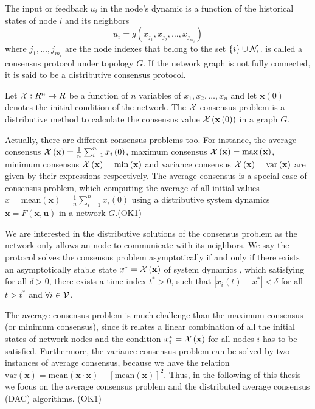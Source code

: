 The input or feedback $u_{i}$ in the node's dynamic is a function
of the historical states of node $i$ and its neighbors
\begin{equation}
u_{i}=g\left(x_{j_{1}},x_{j_{2}},\ldots,x_{j_{m_{i}}}\right)\label{eq:consensus protocol}
\end{equation}
where $j_{1},\ldots,j_{m_{i}}$ are the node indexes that belong to
the set $\left\{ i\right\} \cup{\cal N}_{i}$. 
is called a consensus protocol under topology $G$. If the network
graph is not fully connected, it is said to be a distributive consensus
protocol. 
\begin{defn}
Let ${\cal X}:R^{n}\to R$ be a function of $n$ variables of $x_{1},x_{2},\ldots,x_{n}$
and let $\mathbf{x}\left(0\right)$ denotes the initial condition
of the network. The ${\cal X}$-consensus problem is a distributive
method to calculate the consensus value ${\cal X}\left(\mathbf{x}\left(0\right)\right)$
in a graph $G$. 
\end{defn}
Actually, there are different consensus problems too. For instance,
the average consensus ${\cal X}\left(\mathbf{x}\right)=\frac{1}{n}\sum_{i=1}^{n}x_{i}\left(0\right)$,
maximum consensus ${\cal X}\left(\mathbf{x}\right)=\max\left(\mathbf{x}\right)$,
minimum consensus ${\cal X}\left(\mathbf{x}\right)=\min\left(\mathbf{x}\right)$
and variance consensus ${\cal X}\left(\mathbf{x}\right)=\mbox{var}\left(\mathbf{x}\right)$
are given by their expressions respectively. The average consensus
is a special case of consensus problem, which computing the average
of all initial values $\overline{x}=\mbox{mean}\left(\mathbf{x}\right)=\frac{1}{n}\sum_{i=1}^{n}x_{i}\left(0\right)$
using a distributive system dynamics $\mathbf{\dot{x}}=F\left(\mathbf{x},\mathbf{u}\right)$
in a network $G$.(OK1)

We are interested in the distributive solutions of the consensus problem
as the network only allows an node to communicate with its neighbors.
We say the protocol  solves the
consensus problem asymptotically if and only if there exists an asymptotically
stable state $x^{*}={\cal X}\left(\mathbf{x}\right)$ of system dynamics
, which satisfying for all $\delta>0$,
there exists a time index $t^{*}>0$, such that $\left|x_{i}(t)-x^{*}\right|<\delta$
for all $t>t^{*}$ and $\forall i\in{\cal V}$.

The average consensus problem is much challenge than the maximum consensus
(or minimum consensus), since it relates a linear combination of all
the initial states of network nodes and the condition $x_{i}^{*}={\cal X}\left(\mathbf{x}\right)$
for all nodes $i$ has to be satisfied. Furthermore, the variance
consensus problem can be solved by two instances of average consensus,
because we have the relation $\mbox{var}\left(\mathbf{x}\right)=\mbox{mean}\left(\mathbf{x}\cdot\mathbf{x}\right)-\left[\mbox{mean}\left(\mathbf{x}\right)\right]^{2}$.
Thus, in the following of this thesis we focus on the average consensus
problem and the distributed average consensus (DAC) algorithms. (OK1)


